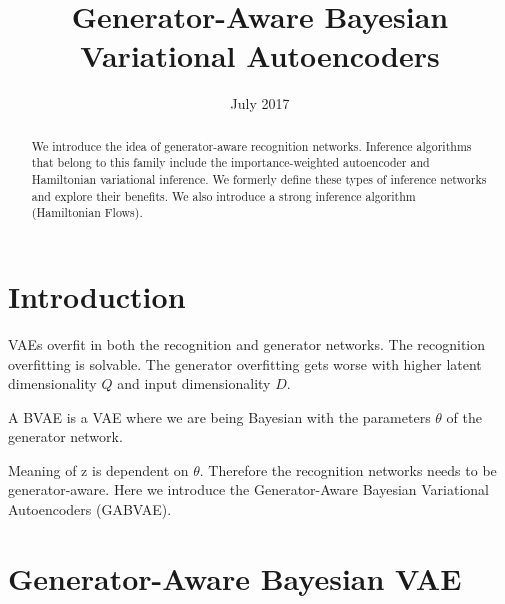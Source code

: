 \documentclass{article}
\title{Generator-Aware Bayesian Variational Autoencoders}
\author{}
\date{July 2017}
\begin{document}
\maketitle

\begin{abstract}
We introduce the idea of generator-aware recognition networks. Inference algorithms that belong to this family include the importance-weighted autoencoder and Hamiltonian variational inference. We formerly define these types of inference networks and explore their benefits.
We also introduce a strong inference algorithm (Hamiltonian Flows). 

\end{abstract}



\section{Introduction}

VAEs \cite{vae} overfit in both the recognition and generator networks. The recognition overfitting is solvable. The generator overfitting gets worse with higher latent dimensionality $Q$ and input dimensionality $D$. 

A BVAE is a VAE where we are being Bayesian with the parameters $\theta$ of the generator network. 

Meaning of z is dependent on $\theta$. Therefore the recognition networks needs to be generator-aware. Here we introduce the Generator-Aware Bayesian Variational Autoencoders (GABVAE).


\section{Generator-Aware Bayesian VAE}
\end{document}
